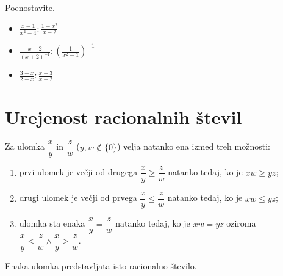         
            \begin{naloga}
                Poenostavite.
                \begin{itemize}
                    \item $\frac{x-1}{x^2-4}:\frac{1-x^2}{x-2}$ 
                    \item $\frac{x-2}{(x+2)^{-1}}:\left(\frac{1}{x^2-1}\right)^{-1}$ 
                    \item $\frac{3-x}{2-x}:\frac{x-3}{x-2}$ 
                \end{itemize}
            \end{naloga}
        

\newpage

\section{Urejenost racionalnih števil}

            
    
                    Za ulomka $\dfrac{x}{y}$ in $\dfrac{z}{w}$ ($y,w\notin\{0\}$) velja natanko ena izmed treh možnosti:
                    
                    \begin{enumerate}
                        \item prvi ulomek je večji od drugega $\dfrac{x}{y}\geq\dfrac{z}{w}$ natanko tedaj, ko je $xw\geq yz$;
                        \item drugi ulomek je večji od prvega $\dfrac{x}{y}\leq\dfrac{z}{w}$ natanko tedaj, ko je $xw\leq yz$;
                        \item ulomka sta enaka $\dfrac{x}{y}=\dfrac{z}{w}$ natanko tedaj, ko je $xw=yz$ oziroma $\dfrac{x}{y}\leq\dfrac{z}{w} \land \dfrac{x}{y}\geq\dfrac{z}{w}$.
                    \end{enumerate}
    
    
                    Enaka ulomka predstavljata isto racionalno število.
    
                    ~

